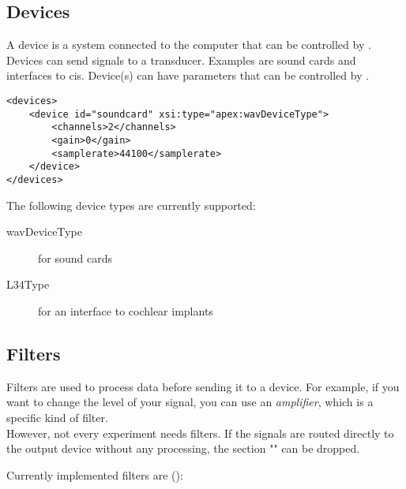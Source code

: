 \subsection{Devices}
\label{sec:Devices}


A device is a system connected to the computer that can be
controlled by \apex. Devices can send signals to a transducer.
Examples are sound cards and interfaces to \acp{ci}. Device(s)
can have parameters that can be controlled by \apex.

\begin{lstlisting}
<devices>
    <device id="soundcard" xsi:type="apex:wavDeviceType">
        <channels>2</channels>
        <gain>0</gain>
        <samplerate>44100</samplerate>
    </device>
</devices>
\end{lstlisting}

The following device types are currently supported:

\begin{description}

\item[wavDeviceType] for sound cards

\item[L34Type] for an interface to cochlear implants
\end{description}

\subsection{Filters}
\label{sec:Filters}


Filters are used to process data before sending it to a device. For example, if you want to change the level of your signal, you can use an \emph{amplifier}, which is a specific kind of filter. \\
However, not every experiment needs filters. If the signals are routed directly to the output device without any processing, the section "" can be dropped.

Currently implemented filters are ():

